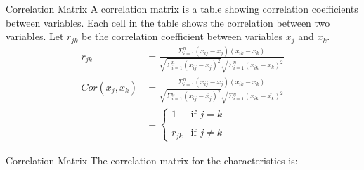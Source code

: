 \documentclass{beamer}
\begin{document}
\begin{frame}{Correlation Matrix}
A correlation matrix is a table showing correlation coefficients between variables. Each cell in the table shows the correlation between two variables.
Let $r_{jk}$ be the correlation coefficient between variables $x_j$ and $x_k$.
\begin{align}
    r_{jk} &= \frac{\Sigma_{i=1}^{n}(x_{ij} - \overline{x_{j}})(x_{ik} - \overline{x_{{k}}})}{\sqrt{\Sigma_{i=1}^{n}(x_{ij} - \overline{x_{j}})^2}\sqrt{\Sigma_{i=1}^{n}(x_{ik} - \overline{x_{k}})^2} }
    \\Cor(x_j, x_k) &= \frac{\Sigma_{i=1}^{n}(x_{ij} - \overline{x_{j}})(x_{ik} - \overline{x_{{k}}})}{\sqrt{\Sigma_{i=1}^{n}(x_{ij} - \overline{x_{j}})^2}\sqrt{\Sigma_{i=1}^{n}(x_{ik} - \overline{x_{k}})^2} }
    \\ &= \begin{cases}
    1 & \text{if } j=k\\ ~\\[-1em]
    r_{jk} & \text{if } j\neq k
        \end{cases}
\end{align}
\end{frame}
\begin{frame}{Correlation Matrix}
The correlation matrix for the characteristics is:
\begin{center}
\begin{table}[h]
    \centering
    \caption{Correlation matrix among THz multipath characteristics}
    \label{table 4}
\end{table}
\end{center}
\end{frame}
\end{document}
